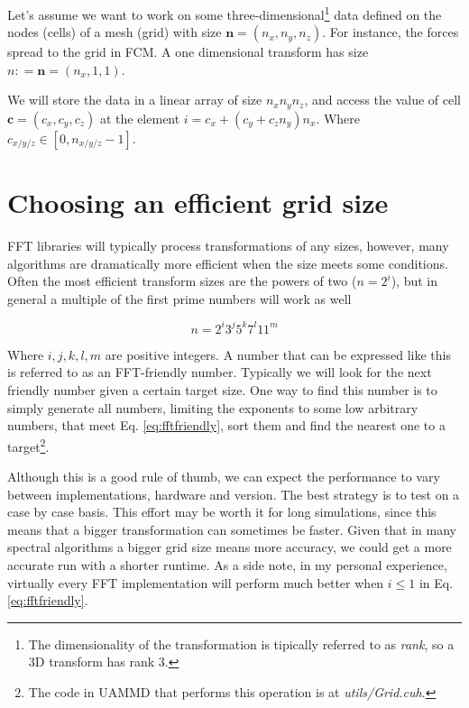 \documentclass[ twoside,openright,titlepage,numbers=noenddot,%
headinclude,footinclude,cleardoublepage=empty,abstract=on,
BCOR=5mm,paper=b5,fontsize=11pt, dvipsnames
]{scrreprt}
\renewcommand{\vec}[1]{\bm{#1}}
\newcommand{\uammd}{\gls{UAMMD}\xspace}
\begin{document}
Let's assume we want to work on some three-dimensional\footnote{The dimensionality of the transformation is tipically referred to as \emph{rank}, so a 3D transform has rank 3.} data defined on the nodes (cells) of a mesh (grid) with size $\vec{n} = (n_x, n_y, n_z)$. For instance, the forces spread to the grid in \gls{FCM}.
A one dimensional transform has size $n: = \vec{n} =(n_x,1,1)$.

We will store the data in a linear array of size $n_xn_yn_z$, and access the value of cell $\vec{c} = (c_x,c_y,c_z)$ at the element $i = c_x + (c_y + c_zn_y)n_x$. Where $c_{x/y/z} \in [0, n_{x/y/z}-1]$.

\section*{Choosing an efficient grid size}
\gls{FFT} libraries will typically process transformations of any sizes, however, many algorithms are dramatically more efficient when the size meets some conditions. Often the most efficient transform sizes are the powers of two ($n = 2^i$), but in general a multiple of the first prime numbers will work as well

\begin{equation}
  \label{eq:fftfriendly}
n = 2^i3^j5^k7^l11^m
\end{equation}

Where $i,j,k,l,m$ are positive integers. A number that can be expressed like this is referred to as an \gls{FFT}-friendly number.
Typically we will look for the next friendly number given a certain target size. One way to find this number is to simply generate all numbers, limiting the exponents to some low arbitrary numbers, that meet Eq. \eqref{eq:fftfriendly}, sort them and find the nearest one to a target\footnote{The code in \uammd that performs this operation is at \emph{utils/Grid.cuh}.}.

Although this is a good rule of thumb, we can expect the performance to vary between implementations, hardware and version. The best strategy is to test on a case by case basis. This effort may be worth it for long simulations, since this means that a bigger transformation can sometimes be faster. Given that in many spectral algorithms a bigger grid size means more accuracy, we could get a more accurate run with a shorter runtime. As a side note, in my personal experience, virtually every \gls{FFT} implementation will perform much better when $i\le 1$ in Eq. \eqref{eq:fftfriendly}.
\end{document}
